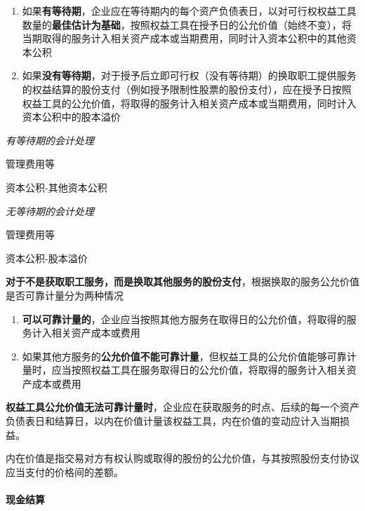 \documentclass[UTF8,12pt]{ctexart}
\newenvironment{Dr}{%
	\begin{list}{}%
		{
			\setlength{\leftmargin}{2em}
			\setlength{\labelwidth}{2em}
			\setlength{\labelsep}{0pt}
			\setlength{\itemindent}{0pt}
			\setlength{\listparindent}{0pt}
			\setlength{\parsep}{0pt}
			\setlength{\topsep}{0pt}
		}
		\item[\textbf{借：}]
	}{%
	\end{list}
}
\newenvironment{Cr}{%
	\begin{list}{}%
		{
			\setlength{\leftmargin}{2em}
			\setlength{\labelwidth}{2em}
			\setlength{\labelsep}{0pt}
			\setlength{\itemindent}{0pt}
			\setlength{\listparindent}{0pt}
			\setlength{\parsep}{0pt}
			\setlength{\topsep}{0pt}
		}
		\item[\textbf{贷：}]
	}{%
	\end{list}
}
\numberwithin{equation}{section} %
\numberwithin{figure}{section}
\numberwithin{table}{section}
\begin{document}
	\begin{enumerate}
		\item 如果\textbf{有等待期}，企业应在等待期内的每个资产负债表日，以对可行权权益工具数量的\textbf{最佳估计为基础}，按照权益工具在授予日的公允价值（始终不变），将当期取得的服务计入相关资产成本或当期费用，同时计入资本公积中的其他资本公积
		
		\item 如果\textbf{没有等待期}，对于授予后立即可行权（没有等待期）的换取职工提供服务的权益结算的股份支付（例如授予限制性股票的股份支付），应在授予日按照权益工具的公允价值，将取得的服务计入相关资产成本或当期费用，同时计入资本公积中的股本溢价
	\end{enumerate}
	
	\textit{有等待期的会计处理}
	
	\begin{Dr}
		管理费用等
	\end{Dr}
	\begin{Cr}
		资本公积-其他资本公积
	\end{Cr}

	\textit{无等待期的会计处理}
	
	\begin{Dr}
		管理费用等
	\end{Dr}
	\begin{Cr}
		资本公积-股本溢价
	\end{Cr}

	\textbf{对于不是获取职工服务，而是换取其他服务的股份支付}，根据换取的服务公允价值是否可靠计量分为两种情况
	\begin{enumerate}
		\item \textbf{可以可靠计量的}，企业应当按照其他方服务在取得日的公允价值，将取得的服务计入相关资产成本或费用
		
		\item 如果其他方服务的\textbf{公允价值不能可靠计量}，但权益工具的公允价值能够可靠计量时，应当按照权益工具在服务取得日的公允价值，将取得的服务计入相关资产成本或费用
	\end{enumerate}

	\textbf{权益工具公允价值无法可靠计量时}，企业应在获取服务的时点、后续的每一个资产负债表日和结算日，以内在价值计量该权益工具，内在价值的变动应计入当期损益。
	
	内在价值是指交易对方有权认购或取得的股份的公允价值，与其按照股份支付协议应当支付的价格间的差额。
	
	\paragraph{现金结算}
	
\end{document}

